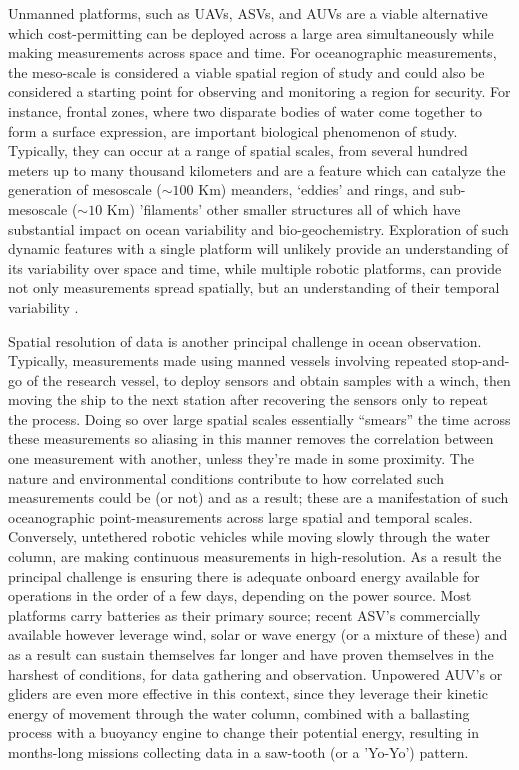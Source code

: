 Unmanned platforms, such as UAVs, ASVs, and AUVs are a viable
alternative which cost-permitting can be deployed across a large area
simultaneously while making measurements across space and time. For
oceanographic measurements, the meso-scale is considered a viable
spatial region of study and could also be considered a starting point
for observing and monitoring a region for security. For instance,
frontal zones, where two disparate bodies of water come together to form
a surface expression, are important biological phenomenon of
study. Typically, they can occur at a range of spatial scales, from
several hundred meters up to many thousand kilometers
\cite{belkin2007fronts} and are a feature which can catalyze the
generation of mesoscale ($\sim 100$ Km) meanders, ‘eddies’ and rings,
and sub-mesoscale ($\sim 10$ Km) 'filaments' other smaller structures
all of which have substantial impact on ocean variability and
bio-geochemistry. Exploration of such dynamic features with a single
platform will unlikely provide an understanding of its variability over
space and time, while multiple robotic platforms, can provide not only
measurements spread spatially, but an understanding of their temporal
variability \cite{pinto20,pinto22}.

Spatial resolution of data is another principal challenge in ocean
observation. Typically, measurements made using manned vessels involving
repeated stop-and-go of the research vessel, to deploy sensors and
obtain samples with a winch, then moving the ship to the next station
after recovering the sensors only to repeat the process. Doing so over
large spatial scales essentially ``smears'' the time across these
measurements so aliasing \cite{} in this manner removes the correlation
between one measurement with another, unless they're made in some
proximity. The nature and environmental conditions contribute to how
correlated such measurements could be (or not) and as a result; these
are a manifestation of such oceanographic point-measurements across
large spatial and temporal scales. Conversely, untethered robotic
vehicles while moving slowly through the water column, are making
continuous measurements in high-resolution. As a result the principal
challenge is ensuring there is adequate onboard energy available for
operations in the order of a few days, depending on the power
source. Most platforms carry batteries as their primary source; recent
ASV's commercially available however leverage wind, solar or wave energy
(or a mixture of these) and as a result can sustain themselves far
longer and have proven themselves in the harshest of conditions, for
data gathering and observation. Unpowered AUV's or gliders are even more
effective in this context, since they leverage their kinetic energy of
movement through the water column, combined with a ballasting process
with a buoyancy engine to change their potential energy, resulting in
months-long missions collecting data in a saw-tooth (or a 'Yo-Yo')
pattern.

